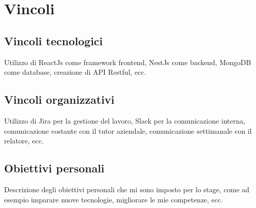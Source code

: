 \section{Vincoli}
\label{sez:vincoli}

\subsection{Vincoli tecnologici}
\label{subsec:vincoli-tecnologici}

Utilizzo di ReactJs come framework frontend, NestJs come backend, MongoDB come database, creazione di API Restful, ecc.

\subsection{Vincoli organizzativi}
\label{subsec:vincoli-organizzativi}

Utilizzo di Jira per la gestione del lavoro, Slack per la comunicazione interna, comunicazione costante con il tutor aziendale, comunicazione settimanale con il relatore, ecc.

\subsection{Obiettivi personali}
\label{subsec:obiettivi-personali}

Descrizione degli obiettivi personali che mi sono imposto per lo stage, come ad esempio imparare nuove tecnologie, migliorare le mie competenze, ecc.
